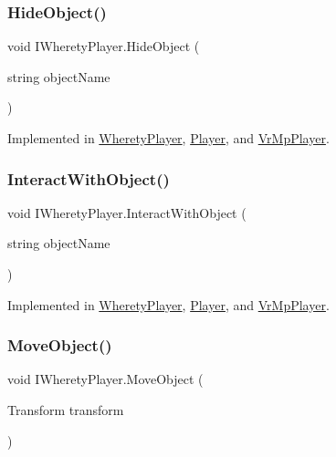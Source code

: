 \subsubsection{\texorpdfstring{HideObject()}{HideObject()}}
{\footnotesize\ttfamily void I\+Wherety\+Player.\+Hide\+Object (\begin{DoxyParamCaption}\item[{string}]{object\+Name }\end{DoxyParamCaption})}



Implemented in \mbox{\hyperlink{class_wherety_player_a0b6974f0ad99de9dd1af2fb65f498264}{Wherety\+Player}}, \mbox{\hyperlink{class_player_ab1b799d89cacee820f5a1e83cf71b440}{Player}}, and \mbox{\hyperlink{class_vr_mp_player_ac7a68dbb6ad184acc78e74a1b063a8d1}{Vr\+Mp\+Player}}.

\mbox{\label{interface_i_wherety_player_af8af069999158f329d99f2709b0b4fb3}} 
\subsubsection{\texorpdfstring{InteractWithObject()}{InteractWithObject()}}
{\footnotesize\ttfamily void I\+Wherety\+Player.\+Interact\+With\+Object (\begin{DoxyParamCaption}\item[{string}]{object\+Name }\end{DoxyParamCaption})}



Implemented in \mbox{\hyperlink{class_wherety_player_a7f1fc81fea5ae4a082fc72b766171834}{Wherety\+Player}}, \mbox{\hyperlink{class_player_ac4db0b8b352f511d0d0715f755876c4e}{Player}}, and \mbox{\hyperlink{class_vr_mp_player_ac9b33feaa74e06413371cd9dbced5530}{Vr\+Mp\+Player}}.

\mbox{\label{interface_i_wherety_player_afd5f6bbda4034e3c00502d0ac26474c1}} 
\subsubsection{\texorpdfstring{MoveObject()}{MoveObject()}}
{\footnotesize\ttfamily void I\+Wherety\+Player.\+Move\+Object (\begin{DoxyParamCaption}\item[{Transform}]{transform }\end{DoxyParamCaption})}



